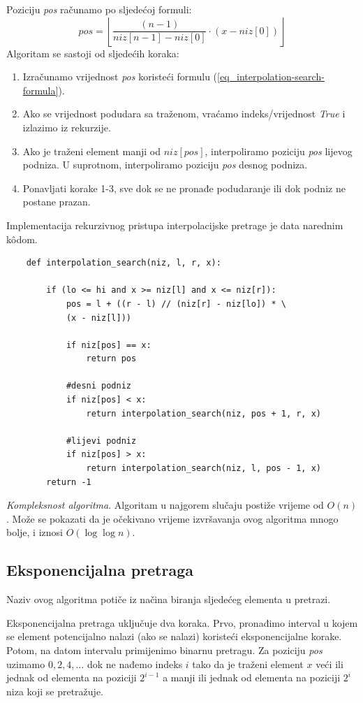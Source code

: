   Poziciju \emph{pos} računamo po sljedećoj formuli:
  \begin{equation}\label{eq_interpolation-search-formula}
     pos = \left \lfloor \frac{ (n-1)}{ niz[n-1] - niz[0]}\cdot(x - niz[0]) \right \rfloor
  \end{equation}
  Algoritam se sastoji od sljedećih koraka:
  \begin{enumerate}
  	\item  Izračunamo vrijednost \emph{pos} koristeći formulu (\ref{eq_interpolation-search-formula}).
  	\item Ako se vrijednost podudara sa traženom, vraćamo indeks/vrijednost \textit{True} i izlazimo iz rekurzije.
  	\item Ako je traženi element manji od $niz[pos]$, interpoliramo poziciju \emph{pos} lijevog podniza. U suprotnom, interpoliramo poziciju \emph{pos} desnog podniza.
  	\item Ponavljati korake 1-3, sve dok se ne pronađe podudaranje ili dok podniz ne postane prazan.
  \end{enumerate}

Implementacija rekurzivnog pristupa interpolacijske pretrage je data narednim k\^odom. 
\begin{verbatim}
	def interpolation_search(niz, l, r, x):

		if (lo <= hi and x >= niz[l] and x <= niz[r]):
			pos = l + ((r - l) // (niz[r] - niz[lo]) * \ 
			(x - niz[l]))
	
			if niz[pos] == x:
				return pos
	
			#desni podniz
			if niz[pos] < x:
				return interpolation_search(niz, pos + 1, r, x)
	
			#lijevi podniz
			if niz[pos] > x:
				return interpolation_search(niz, l, pos - 1, x)
		return -1
\end{verbatim}

\textit{Kompleksnost algoritma}. Algoritam u najgorem slučaju postiže vrijeme od $O(n)$.  Može se pokazati da je očekivano vrijeme izvršavanja ovog algoritma mnogo bolje, i iznosi $O(\log \log n)$.

\subsection{Eksponencijalna pretraga}

Naziv ovog algoritma potiče iz načina biranja sljedećeg elementa u pretrazi. 


Eksponencijalna pretraga uključuje dva koraka. Prvo, pronađimo interval u kojem se element potencijalno nalazi (ako se nalazi) koristeći eksponencijalne korake. Potom, na datom intervalu primijenimo binarnu pretragu. Za  poziciju \emph{pos} uzimamo $0, 2, 4, \ldots$ dok ne nađemo indeks  $i$ tako da je traženi element $x$ veći ili jednak od elementa  na poziciji $2^{i-1}$ a manji ili jednak od elementa na poziciji $2^i$ niza koji se pretražuje. 


